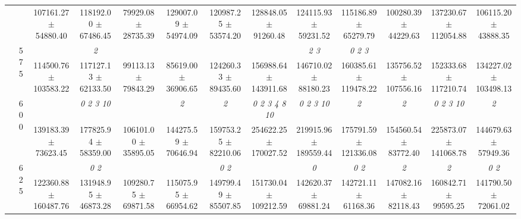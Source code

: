 \begin{table}[h]
{\begin{tabular}{
        ccccccccccccc}
 & & 107161.27 $\pm$ 54880.40& 118192.00 $\pm$ 67486.45& 79929.08 $\pm$ 28735.39& 129007.09 $\pm$ 54974.09& 120987.25 $\pm$ 53574.20& 128848.05 $\pm$ 91260.48& 124115.93 $\pm$ 59231.52& 115186.89 $\pm$ 65279.79& 100280.39 $\pm$ 44229.63& 137230.67 $\pm$ 112054.88& 106115.20 $\pm$ 43888.35 \\ 
 & \multirow{2}{*}{575}& \cellcolor[HTML]{EFEFEF} & \cellcolor[HTML]{EFEFEF} \textit{ 2 }& \cellcolor[HTML]{EFEFEF} & \cellcolor[HTML]{EFEFEF} & \cellcolor[HTML]{EFEFEF} & \cellcolor[HTML]{EFEFEF} & \cellcolor[HTML]{EFEFEF} \textit{ 2 3 }& \cellcolor[HTML]{EFEFEF} \textit{ 0 2 3 }& \cellcolor[HTML]{EFEFEF} & \cellcolor[HTML]{EFEFEF} & \cellcolor[HTML]{EFEFEF}  \\ 
 & & \cellcolor[HTML]{EFEFEF} 114500.76 $\pm$ 103583.22& \cellcolor[HTML]{EFEFEF} 117127.13 $\pm$ 62133.50& \cellcolor[HTML]{EFEFEF} 99113.13 $\pm$ 79843.29& \cellcolor[HTML]{EFEFEF} 85619.00 $\pm$ 36906.65& \cellcolor[HTML]{EFEFEF} 124260.33 $\pm$ 89435.60& \cellcolor[HTML]{EFEFEF} 156988.64 $\pm$ 143911.68& \cellcolor[HTML]{EFEFEF} 146710.02 $\pm$ 88180.23& \cellcolor[HTML]{EFEFEF} 160385.61 $\pm$ 119478.22& \cellcolor[HTML]{EFEFEF} 135756.52 $\pm$ 107556.16& \cellcolor[HTML]{EFEFEF} 152333.68 $\pm$ 117210.74& \cellcolor[HTML]{EFEFEF} 134227.02 $\pm$ 103498.13 \\ 
 & \multirow{2}{*}{600}& & \textit{  0  2  3 10 }& & \textit{ 2 }& \textit{ 2 }& \textit{  0  2  3  4  8 10 }& \textit{  0  2  3 10 }& \textit{ 2 }& \textit{ 2 }& \textit{  0  2  3 10 }& \textit{ 2 } \\ 
 & & 139183.39 $\pm$ 73623.45& 177825.94 $\pm$ 58359.00& 106101.00 $\pm$ 35895.05& 144275.59 $\pm$ 70646.94& 159753.25 $\pm$ 82210.06& 254622.25 $\pm$ 170027.52& 219915.96 $\pm$ 189559.44& 175791.59 $\pm$ 121336.08& 154560.54 $\pm$ 83772.40& 225873.07 $\pm$ 141068.78& 144679.63 $\pm$ 57949.36 \\ 
 & \multirow{2}{*}{625}& \cellcolor[HTML]{EFEFEF} & \cellcolor[HTML]{EFEFEF} \textit{ 0 2 }& \cellcolor[HTML]{EFEFEF} & \cellcolor[HTML]{EFEFEF} & \cellcolor[HTML]{EFEFEF} \textit{ 0 2 }& \cellcolor[HTML]{EFEFEF} & \cellcolor[HTML]{EFEFEF} \textit{ 0 }& \cellcolor[HTML]{EFEFEF} \textit{ 0 2 }& \cellcolor[HTML]{EFEFEF} \textit{ 2 }& \cellcolor[HTML]{EFEFEF} \textit{ 2 }& \cellcolor[HTML]{EFEFEF} \textit{ 0 2 } \\ 
 & & \cellcolor[HTML]{EFEFEF} 122360.88 $\pm$ 160487.76& \cellcolor[HTML]{EFEFEF} 131948.95 $\pm$ 46873.28& \cellcolor[HTML]{EFEFEF} 109280.75 $\pm$ 69871.58& \cellcolor[HTML]{EFEFEF} 115075.95 $\pm$ 66954.62& \cellcolor[HTML]{EFEFEF} 149799.49 $\pm$ 85507.85& \cellcolor[HTML]{EFEFEF} 151730.04 $\pm$ 109212.59& \cellcolor[HTML]{EFEFEF} 142620.37 $\pm$ 69881.24& \cellcolor[HTML]{EFEFEF} 142721.11 $\pm$ 61168.36& \cellcolor[HTML]{EFEFEF} 147082.16 $\pm$ 82118.43& \cellcolor[HTML]{EFEFEF} 160842.71 $\pm$ 99595.25& \cellcolor[HTML]{EFEFEF} 141790.50 $\pm$ 72061.02 \\ 

\end{tabular}}
\end{table}
